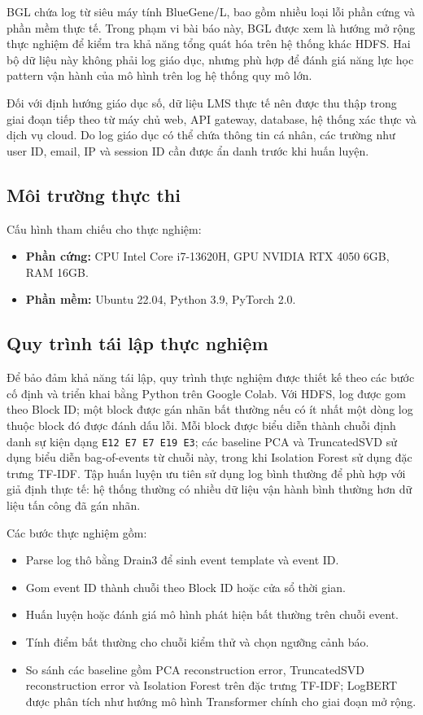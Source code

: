 \documentclass[conference]{IEEEtran}
\begin{document}
BGL chứa log từ siêu máy tính BlueGene/L, bao gồm nhiều loại lỗi phần cứng và phần mềm thực tế. Trong phạm vi bài báo này, BGL được xem là hướng mở rộng thực nghiệm để kiểm tra khả năng tổng quát hóa trên hệ thống khác HDFS. Hai bộ dữ liệu này không phải log giáo dục, nhưng phù hợp để đánh giá năng lực học pattern vận hành của mô hình trên log hệ thống quy mô lớn.

Đối với định hướng giáo dục số, dữ liệu LMS thực tế nên được thu thập trong giai đoạn tiếp theo từ máy chủ web, API gateway, database, hệ thống xác thực và dịch vụ cloud. Do log giáo dục có thể chứa thông tin cá nhân, các trường như user ID, email, IP và session ID cần được ẩn danh trước khi huấn luyện.

\subsection{Môi trường thực thi}
Cấu hình tham chiếu cho thực nghiệm:
\begin{itemize}
    \item \textbf{Phần cứng:} CPU Intel Core i7-13620H, GPU NVIDIA RTX 4050 6GB, RAM 16GB.
    \item \textbf{Phần mềm:} Ubuntu 22.04, Python 3.9, PyTorch 2.0.
\end{itemize}

\subsection{Quy trình tái lập thực nghiệm}
Để bảo đảm khả năng tái lập, quy trình thực nghiệm được thiết kế theo các bước cố định và triển khai bằng Python trên Google Colab. Với HDFS, log được gom theo Block ID; một block được gán nhãn bất thường nếu có ít nhất một dòng log thuộc block đó được đánh dấu lỗi. Mỗi block được biểu diễn thành chuỗi định danh sự kiện dạng \texttt{E12 E7 E7 E19 E3}; các baseline PCA và TruncatedSVD sử dụng biểu diễn bag-of-events từ chuỗi này, trong khi Isolation Forest sử dụng đặc trưng TF-IDF. Tập huấn luyện ưu tiên sử dụng log bình thường để phù hợp với giả định thực tế: hệ thống thường có nhiều dữ liệu vận hành bình thường hơn dữ liệu tấn công đã gán nhãn.

Các bước thực nghiệm gồm:
\begin{itemize}
    \item Parse log thô bằng Drain3 để sinh event template và event ID.
    \item Gom event ID thành chuỗi theo Block ID hoặc cửa sổ thời gian.
    \item Huấn luyện hoặc đánh giá mô hình phát hiện bất thường trên chuỗi event.
    \item Tính điểm bất thường cho chuỗi kiểm thử và chọn ngưỡng cảnh báo.
    \item So sánh các baseline gồm PCA reconstruction error, TruncatedSVD reconstruction error và Isolation Forest trên đặc trưng TF-IDF; LogBERT được phân tích như hướng mô hình Transformer chính cho giai đoạn mở rộng.
\end{itemize}
\end{document}
